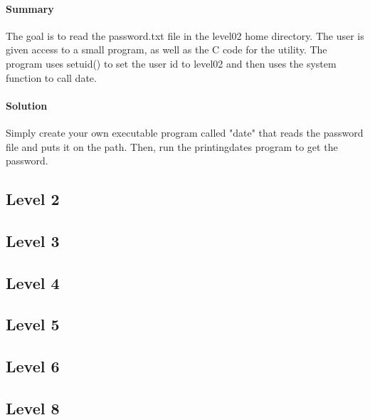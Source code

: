 \documentclass[12pt]{article}
\begin{document}
\paragraph{Summary} The goal is to read the password.txt file in the level02
home directory. The user is given access to a small program, as well as the
C code for the utility. The program uses setuid() to set the user id to level02 and then uses the system
function to call date.
\paragraph{Solution} Simply create your own executable program called "date"
that reads the password file and puts it on the path. Then, run the
printingdates program to get the password.

\subsection{Level 2}

\subsection{Level 3}

\subsection{Level 4}

\subsection{Level 5}

\subsection{Level 6}


\subsection{Level 8}
\end{document}
